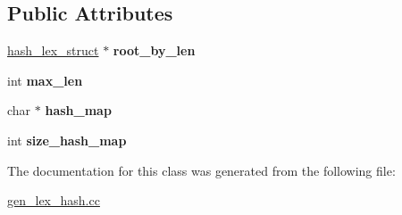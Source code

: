\subsection*{Public Attributes}
\begin{DoxyCompactItemize}
\item 
\mbox{\label{classhash__map__info_ac2aa4fe0f73ca81c446c5c3debd4c987}} 
\mbox{\hyperlink{structhash__lex__struct}{hash\+\_\+lex\+\_\+struct}} $\ast$ {\bfseries root\+\_\+by\+\_\+len}
\item 
\mbox{\label{classhash__map__info_a2be5e96b93708e727cc9d501fdd7d7fc}} 
int {\bfseries max\+\_\+len}
\item 
\mbox{\label{classhash__map__info_a1728730b62450eef23280a890f4c6c84}} 
char $\ast$ {\bfseries hash\+\_\+map}
\item 
\mbox{\label{classhash__map__info_af77831198d9db2dc5dde8cbaa2e78037}} 
int {\bfseries size\+\_\+hash\+\_\+map}
\end{DoxyCompactItemize}


The documentation for this class was generated from the following file\+:\begin{DoxyCompactItemize}
\item 
\mbox{\hyperlink{gen__lex__hash_8cc}{gen\+\_\+lex\+\_\+hash.\+cc}}\end{DoxyCompactItemize}
